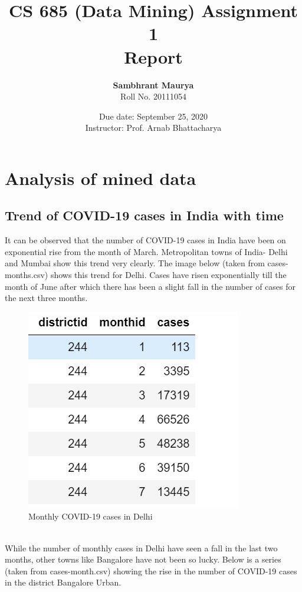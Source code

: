 \documentclass{article}
\title{CS 685 (Data Mining)
Assignment 1 \\ Report}
\author{\textbf{Sambhrant Maurya} \\ Roll No. 20111054}
\date{Due date: September 25, 2020 \\ Instructor: Prof. Arnab Bhattacharya}
\begin{document}
\maketitle
\pagebreak
\lstset{style=mystyle}
\section{Analysis of mined data}
\subsection{Trend of COVID-19 cases in India with time}
It can be observed that the number of COVID-19 cases in India have been on exponential rise from the month of March. Metropolitan towns of India- Delhi and Mumbai show this trend very clearly. The image below (taken from cases-months.csv) shows this trend for Delhi. Cases have risen exponentially till the month of June after which there has been a slight fall in the number of cases for the next three months. 
\begin{figure}[h]
\centerline{\includegraphics{delhi_month.png}}
\caption{Monthly COVID-19 cases in Delhi}
\label{fig}
\end{figure} \\
While the number of monthly cases in Delhi have seen a fall in the last two months, other towns like Bangalore have not been so lucky. Below is a series (taken from cases-month.csv) showing the rise in the number of COVID-19 cases in the district Bangalore Urban. \\
\end{document}
